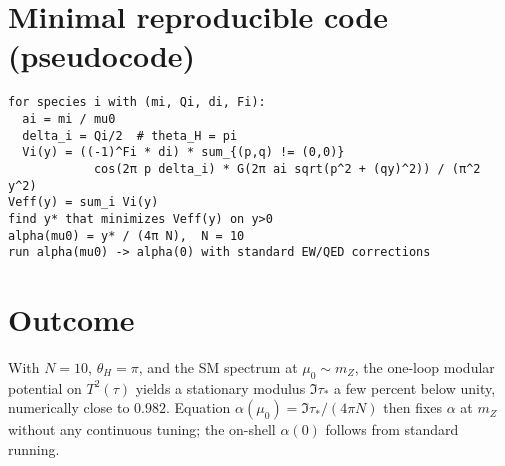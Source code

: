 \documentclass[11pt,a4paper]{article}
\begin{document}
\section*{Minimal reproducible code (pseudocode)}
\begin{verbatim}
for species i with (mi, Qi, di, Fi):
  ai = mi / mu0
  delta_i = Qi/2  # theta_H = pi
  Vi(y) = ((-1)^Fi * di) * sum_{(p,q) != (0,0)}
            cos(2π p delta_i) * G(2π ai sqrt(p^2 + (qy)^2)) / (π^2 y^2)
Veff(y) = sum_i Vi(y)
find y* that minimizes Veff(y) on y>0
alpha(mu0) = y* / (4π N),  N = 10
run alpha(mu0) -> alpha(0) with standard EW/QED corrections
\end{verbatim}

\section*{Outcome}
With \(N=10\), \(\theta_H=\pi\), and the SM spectrum at \(\mu_0\sim m_Z\), the one-loop modular potential on \(T^2(\tau)\) yields a stationary modulus \(\Im\tau_*\) a few percent below unity, numerically close to \(0.982\). Equation \(\alpha(\mu_0)=\Im\tau_*/(4\pi N)\) then fixes \(\alpha\) at \(m_Z\) without any continuous tuning; the on-shell \(\alpha(0)\) follows from standard running.
\end{document}
